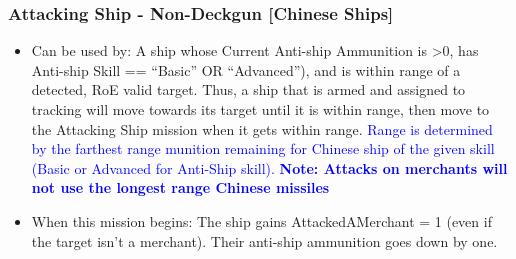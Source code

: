 \documentclass{article}
\begin{document}
    \subsubsection{Attacking Ship - Non-Deckgun [Chinese Ships]}
        \begin{itemize}
            \item{Can be used by:} A ship whose Current Anti-ship Ammunition is \textgreater 0, has Anti-ship Skill == ``Basic'' OR ``Advanced''), and is within range of a detected, RoE valid target. Thus, a ship that is armed and assigned to tracking will move towards its target until it is within range, then move to the Attacking Ship mission when it gets within range. \textcolor{blue}{Range is determined by the farthest range munition remaining for Chinese ship of the given skill (Basic or Advanced for Anti-Ship skill). \textbf{Note: Attacks on merchants will not use the longest range Chinese missiles}}
            
            \item{When this mission begins:} The ship gains AttackedAMerchant = 1 (even if the target isn't a merchant). Their anti-ship ammunition goes down by one.\\ 
            

\end{itemize}
\end{document}
